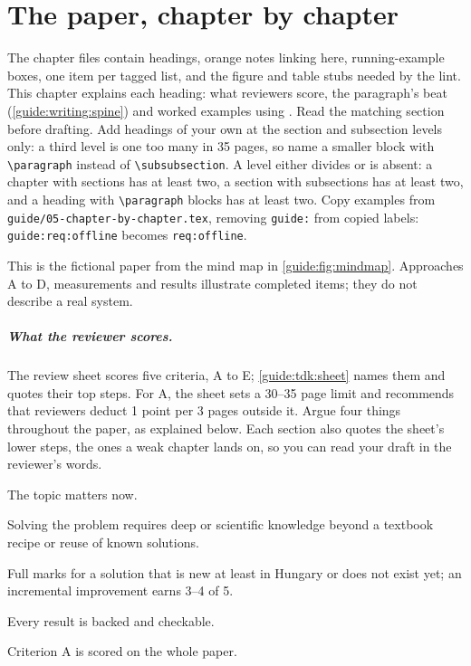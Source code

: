 \chapter{The paper, chapter by chapter}\label{guide:chapters}
The chapter files contain headings, orange notes linking here, running-example boxes, one item per tagged list, and the figure and table stubs needed by the lint. This chapter explains each heading: what reviewers score, the paragraph's beat (\cref{guide:writing:spine}) and worked examples using \exname. Read the matching section before drafting. Add headings of your own at the section and subsection levels only: a third level is one too many in 35 pages, so name a smaller block with \texttt{\textbackslash paragraph} instead of \texttt{\textbackslash subsubsection}. A level either divides or is absent: a chapter with sections has at least two, a section with subsections has at least two, and a heading with \texttt{\textbackslash paragraph} blocks has at least two. Copy examples from \texttt{guide/05-chapter-by-chapter.tex}, removing \texttt{guide:} from copied labels: \texttt{guide:req:offline} becomes \texttt{req:offline}.

This is the fictional paper from the mind map in \cref{guide:fig:mindmap}. Approaches A to D, measurements and results illustrate completed items; they do not describe a real system.

\paragraph{What the reviewer scores.} The review sheet scores five criteria, A to E; \cref{guide:tdk:sheet} names them and quotes their top steps. For A, the sheet sets a 30--35 page limit and recommends that reviewers deduct 1 point per 3 pages outside it. Argue four things throughout the paper, as explained below. Each section also quotes the sheet's lower steps, the ones a weak chapter lands on, so you can read your draft in the reviewer's words.
\begin{description}[noitemsep]
  \item[Relevance (C)] The topic matters now.
  \item[Non-triviality (C and D/1)] Solving the problem requires deep or scientific knowledge beyond a textbook recipe or reuse of known solutions.
  \item[Novelty (D/1)] Full marks for a solution that is new at least in Hungary or does not exist yet; an incremental improvement earns 3--4 of 5.
  \item[Correctness (D/2)] Every result is backed and checkable.
\end{description}
Criterion A is scored on the whole paper.

